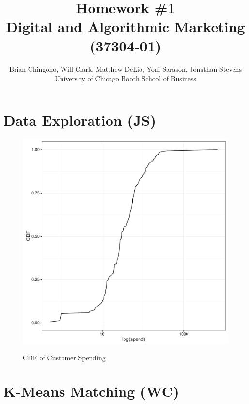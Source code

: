 



\title{Homework \#1\\
Digital and Algorithmic Marketing (37304-01)}
\author{Brian Chingono, Will Clark, Matthew DeLio, Yoni Sarason, Jonathan Stevens\\
University of Chicago Booth School of Business}

\maketitle

\section{Data Exploration (JS)}

\begin{figure}[!htb]
  \centering
  \caption{CDF of Customer Spending}
  \includegraphics[scale=.5]{cdf.pdf}
  \label{fig:cdf}
\end{figure}

\section{K-Means Matching (WC)}

